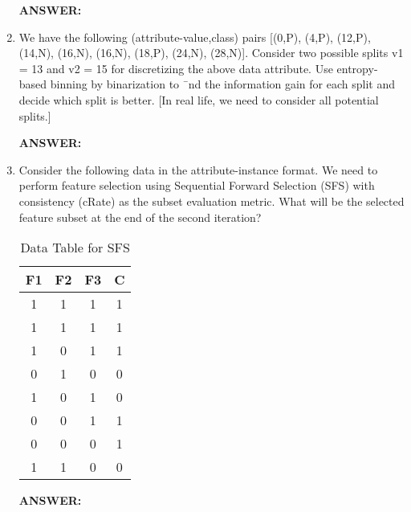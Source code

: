 \documentclass{article}
\begin{document}
\begin{enumerate}
\textbf{ANSWER:} 

\item We have the following (attribute-value,class) pairs [(0,P), (4,P),
(12,P), (14,N), (16,N), (16,N), (18,P), (24,N), (28,N)]. Consider two
possible splits v1 = 13 and v2 = 15 for discretizing the above data
attribute. Use entropy-based binning by binarization to ¯nd the
information gain for each split and decide which split is better. [In
real life, we need to consider all potential splits.]

\textbf{ANSWER:} 


\item Consider the following data in the attribute-instance format. We
need to perform feature selection using Sequential Forward Selection
(SFS) with consistency (cRate) as the subset evaluation metric. What
will be the selected feature subset at the end of the second iteration?
\begin{table}[h]
  \begin{center}
    \begin{tabular}{| c || c | c | c |}
      \hline F1 & F2 & F3 & C \\
      \hline 1 & 1 & 1 & 1 \\
      \hline 1 & 1 & 1 & 1 \\
      \hline 1 & 0 & 1 & 1 \\
      \hline 0 & 1 & 0 & 0 \\
      \hline 1 & 0 & 1 & 0 \\
      \hline 0 & 0 & 1 & 1 \\
      \hline 0 & 0 & 0 & 1 \\
      \hline 1 & 1 & 0 & 0 \\
      \hline 
    \end{tabular}
    \caption{Data Table for SFS}
  \end{center}
\end{table}
\textbf{ANSWER:} 
\end{enumerate}
\end{document}
